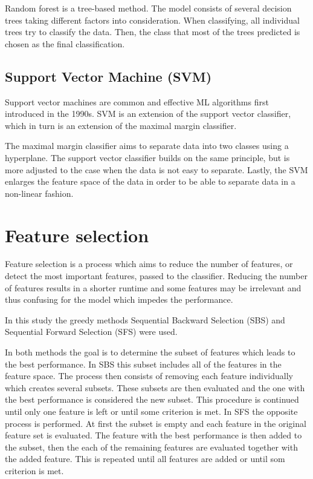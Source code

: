 \documentclass{kththesis}
\begin{document}
Random forest is a tree-based method. The model consists of several decision trees taking different factors into consideration. When classifying, all individual trees try to classify the data. Then, the class that most of the trees predicted is chosen as the final classification. \parencite{ibmrforest}


\subsection{Support Vector Machine (SVM)}

Support vector machines are common and effective ML algorithms first introduced in the 1990s. SVM is an extension of the support vector classifier, which in turn is an extension of the maximal margin classifier.

The maximal margin classifier aims to separate data into two classes using a hyperplane. The support vector classifier builds on the same principle, but is more adjusted to the case when the data is not easy to separate. Lastly, the SVM enlarges the feature space of the data in order to be able to separate data in a non-linear fashion. \parencite{james2013introduction}


\section{Feature selection}


Feature selection is a process which aims to reduce the number of features, or detect the most important features, passed to the classifier. Reducing the number of features results in a shorter runtime and some features may be irrelevant and thus confusing for the model which impedes the performance.\parencite{chaganti2022thyroid}

In this study the greedy methods Sequential Backward Selection (SBS) and Sequential Forward Selection (SFS) were used.

In both methods the goal is to determine the subset of features which leads to the best performance. In SBS this subset includes all of the features in the feature space. The process then consists of removing each feature individually which creates several subsets. These subsets are then evaluated and the one with the best performance is considered the new subset. This procedure is continued until only one feature is left or until some criterion is met. In SFS the opposite process is performed. At first the subset is empty and each feature in the original feature set is evaluated. The feature with the best performance is then added to the subset, then the each of the remaining features are evaluated together with the added feature. This is repeated until all features are added or until som criterion is met.\parencite{chaganti2022thyroid}
\end{document}
